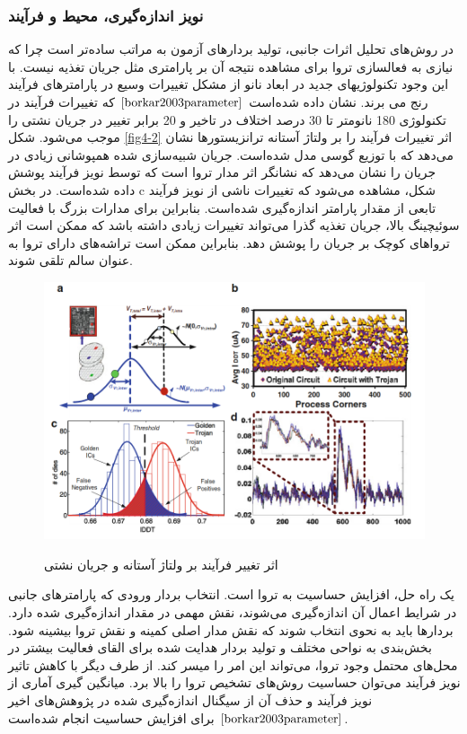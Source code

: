 \subsubsection {نویز اندازه‌گیری، محیط و فرآیند}
در روش‌های تحلیل اثرات جانبی، تولید بردارهای آزمون به مراتب ساده‌تر است چرا که نیازی به فعالسازی تروا برای مشاهده نتیجه آن بر پارامتری مثل جریان تغذیه نیست. با این وجود تکنولوژیهای جدید در ابعاد نانو از مشکل تغییرات وسیع در پارامترهای فرآیند رنج می برند. نشان داده شده‌است $\cite{borkar2003parameter}$ که تغییرات فرآیند در تکنولوژی 180 نانومتر تا 30 درصد اختلاف در تاخیر و 20 برابر تغییر در جریان نشتی را موجب می‌شود. شکل  \ref{fig4-2} اثر تغییرات فرآیند را بر ولتاژ آستانه ترانزیستورها نشان می‌دهد که با توزیع گوسی مدل شده‌است. جریان شبیه‌سازی شده همپوشانی زیادی در جریان را نشان می‌دهد که نشانگر اثر مدار تروا است که توسط نویز فرآیند پوشش داده شده‌است. در بخش c شکل، مشاهده می‌شود که تغییرات ناشی از نویز فرآیند تابعی از مقدار پارامتر اندازه‌گیری شده‌است. بنابراین برای مدارات بزرگ با فعالیت سوئیچینگ بالا، جریان تغذیه گذرا می‌تواند تغییرات زیادی داشته باشد که ممکن است اثر تروا‌های کوچک بر جریان را پوشش دهد. بنابراین ممکن است تراشه‌های دارای تروا به عنوان سالم تلقی شوند. 

\begin{figure}
	\begin{center}\label{fig4-2}
		\includegraphics[scale=0.7]{figs/fig3-4.png}
		\caption[اثر تغییر فرآیند بر ولتاژ آستانه و جریان نشتی]
		{اثر تغییر فرآیند بر ولتاژ آستانه و جریان نشتی \cite{borkar2003parameter}}
		\label{fig3-4}
	\end{center}
\end{figure}
یک راه حل، افزایش حساسیت به تروا است. انتخاب بردار ورودی که پارامترهای جانبی در شرایط اعمال آن اندازه‌گیری می‌شوند، نقش مهمی در مقدار اندازه‌گیری شده دارد. بردارها باید به نحوی انتخاب شوند که نقش مدار اصلی کمینه و نقش تروا بیشینه شود. بخش‌بندی به نواحی مختلف و تولید بردار هدایت شده برای القای فعالیت بیشتر در محل‌های محتمل وجود تروا، می‌تواند این امر را میسر کند. از طرف دیگر با کاهش تاثیر نویز فرآیند می‌توان حساسیت روش‌های تشخیص تروا را بالا برد. میانگین گیری آماری از نویز فرآیند و حذف آن از سیگنال اندازه‌گیری شده در پژوهش‌های اخیر $\cite{borkar2003parameter}$ برای افزایش حساسیت انجام شده‌است.

